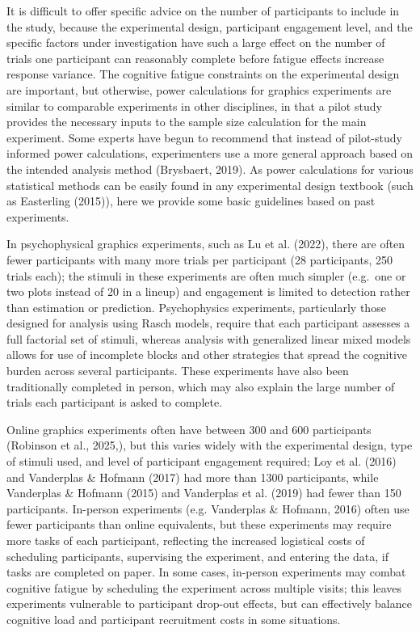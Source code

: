 \documentclass[
  10pt,
]{article}
\begin{document}
It is difficult to offer specific advice on the number of participants
to include in the study, because the experimental design, participant
engagement level, and the specific factors under investigation have such
a large effect on the number of trials one participant can reasonably
complete before fatigue effects increase response variance. The
cognitive fatigue constraints on the experimental design are important,
but otherwise, power calculations for graphics experiments are similar
to comparable experiments in other disciplines, in that a pilot study
provides the necessary inputs to the sample size calculation for the
main experiment. Some experts have begun to recommend that instead of
pilot-study informed power calculations, experimenters use a more
general approach based on the intended analysis method (Brysbaert,
2019). As power calculations for various statistical methods can be
easily found in any experimental design textbook (such as Easterling
(2015)), here we provide some basic guidelines based on past
experiments.

In psychophysical graphics experiments, such as Lu et al. (2022), there
are often fewer participants with many more trials per participant (28
participants, 250 trials each); the stimuli in these experiments are
often much simpler (e.g.~one or two plots instead of 20 in a lineup) and
engagement is limited to detection rather than estimation or prediction.
Psychophysics experiments, particularly those designed for analysis
using Rasch models, require that each participant assesses a full
factorial set of stimuli, whereas analysis with generalized linear mixed
models allows for use of incomplete blocks and other strategies that
spread the cognitive burden across several participants. These
experiments have also been traditionally completed in person, which may
also explain the large number of trials each participant is asked to
complete.

Online graphics experiments often have between 300 and 600 participants
(Robinson et al., 2025,), but this varies widely with the experimental
design, type of stimuli used, and level of participant engagement
required; Loy et al. (2016) and Vanderplas \& Hofmann (2017) had more
than 1300 participants, while Vanderplas \& Hofmann (2015) and
Vanderplas et al. (2019) had fewer than 150 participants. In-person
experiments (e.g. Vanderplas \& Hofmann, 2016) often use fewer
participants than online equivalents, but these experiments may require
more tasks of each participant, reflecting the increased logistical
costs of scheduling participants, supervising the experiment, and
entering the data, if tasks are completed on paper. In some cases,
in-person experiments may combat cognitive fatigue by scheduling the
experiment across multiple visits; this leaves experiments vulnerable to
participant drop-out effects, but can effectively balance cognitive load
and participant recruitment costs in some situations.
\end{document}
